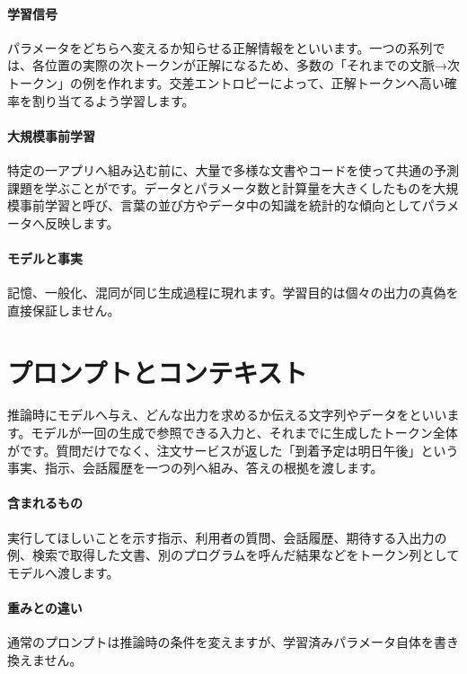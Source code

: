 \paragraph{学習信号}
        パラメータをどちらへ変えるか知らせる正解情報をといいます。一つの系列では、各位置の実際の次トークンが正解になるため、多数の「それまでの文脈→次トークン」の例を作れます。交差エントロピーによって、正解トークンへ高い確率を割り当てるよう学習します。

\par
\endgroup
\medskip
\begingroup
\paragraph{大規模事前学習}
        特定の一アプリへ組み込む前に、大量で多様な文書やコードを使って共通の予測課題を学ぶことがです。データとパラメータ数と計算量を大きくしたものを大規模事前学習と呼び、言葉の並び方やデータ中の知識を統計的な傾向としてパラメータへ反映します。

\paragraph{モデルと事実}
        記憶、一般化、混同が同じ生成過程に現れます。学習目的は個々の出力の真偽を直接保証しません。

\par
\endgroup
\par
\endgroup


\section{プロンプトとコンテキスト}
\label{sec:06-machine-learning-29}

推論時にモデルへ与え、どんな出力を求めるか伝える文字列やデータをといいます。モデルが一回の生成で参照できる入力と、それまでに生成したトークン全体がです。質問だけでなく、注文サービスが返した「到着予定は明日午後」という事実、指示、会話履歴を一つの列へ組み、答えの根拠を渡します。

\begingroup
\begingroup
\paragraph{含まれるもの}
        実行してほしいことを示す指示、利用者の質問、会話履歴、期待する入出力の例、検索で取得した文書、別のプログラムを呼んだ結果などをトークン列としてモデルへ渡します。

\paragraph{重みとの違い}
        通常のプロンプトは推論時の条件を変えますが、学習済みパラメータ自体を書き換えません。

